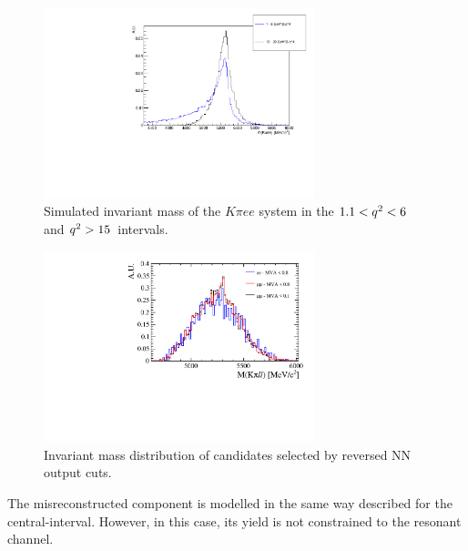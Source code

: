  \begin{figure}[h!]
\centering
\includegraphics[width=0.70\textwidth]{RKst/figs/high_central_mass_comparison.pdf}
\caption{Simulated invariant mass of the $K\pi ee$ system in the $1.1 < {q^2} < 6$ and ${q^2} > 15$~\gevgevcccc intervals.  }
\label{fig:high_central_mass_comparison}
\end{figure}

 \begin{figure}[hb!]
\centering
\includegraphics[width=0.70\textwidth]{RKst/figs/highq2_comb.pdf}
\caption{Invariant mass distribution of candidates selected by reversed NN output cuts.}
\label{fig:highq2_comb}
\end{figure}

The misreconstructed component is modelled in the same way described for the central-\qsq interval.
However, in this case, its yield is not constrained to the resonant channel.

